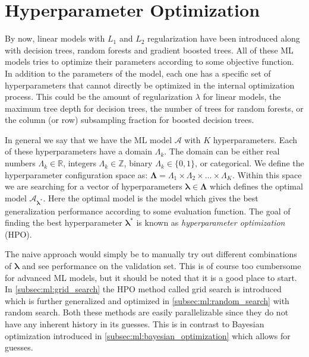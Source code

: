 \section{Hyperparameter Optimization}
\label{sec:ml:hyperparameter_optimization}
By now, linear models with $L_1$ and $L_2$ regularization have been introduced along with decision trees, random forests and gradient boosted trees. All of these ML models tries to optimize their parameters according to some objective function. In addition to the parameters of the model, each one has a specific set of hyperparameters that cannot directly be optimized in the internal optimization process. This could be the amount of regularization $\lambda$ for linear models, the maximum tree depth for decision trees, the number of trees for random forests, or the column (or row) subsampling fraction for boosted decision trees. 

In general we say that we have the ML model $\mathcal{A}$ with $K$ hyperparameters. Each of these hyperparameters have a domain $\Lambda_k$. The domain can be either real numbers $\Lambda_k \in \mathbb{R}$, integers $\Lambda_k \in \mathbb{Z}$, binary $\Lambda_k \in \{0, 1\}$, or categorical. We define the hyperparameter configuration space as: $\bm{\Lambda} = \Lambda_1 \times \Lambda_2 \times \dots \times \Lambda_K$. Within this space we are searching for a vector of hyperparameters $\bm{\lambda} \in \bm{\Lambda}$ which defines the optimal model $\mathcal{A}_{\bm{\lambda}^*}$. Here the optimal model is the model which gives the best generalization performance according to some evaluation function. The goal of finding the best hyperparameter $\bm{\lambda^*}$ is known as \emph{hyperparameter optimization} (HPO).

The naive approach would simply be to manually try out different combinations of $\bm{\lambda}$ and see performance on the validation set. This is of course too cumbersome for advanced ML models, but it should be noted that it is a good place to start. In \autoref{subsec:ml:grid_search} the HPO method called grid search is introduced which is further generalized and optimized in \autoref{subsec:ml:random_search} with random search. Both these methods are easily parallelizable since they do not have any inherent history in its guesses. This is in contrast to Bayesian optimization introduced in \autoref{subsec:ml:bayesian_optimization} which allows for  guesses.


